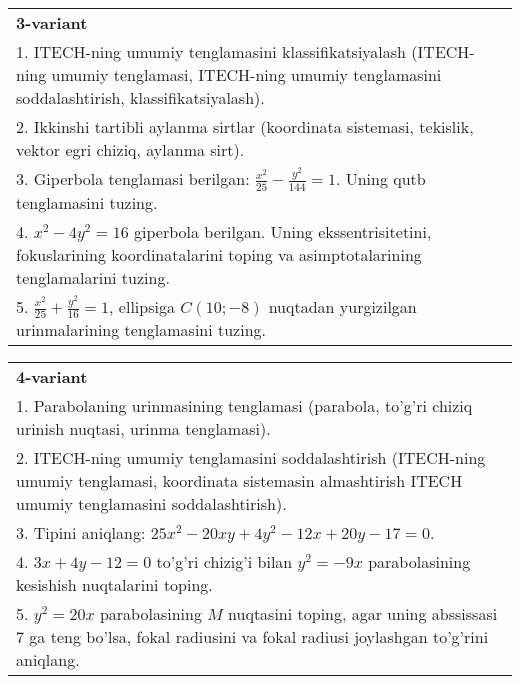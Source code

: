 \documentclass{article}
\begin{document}
\begin{tabular}{m{17cm}}
\textbf{3-variant}\\
1. ITECH-ning umumiy tenglamasini klassifikatsiyalash (ITECH-ning umumiy tenglamasi, ITECH-ning umumiy tenglamasini soddalashtirish, klassifikatsiyalash).\\

2. Ikkinshi tartibli aylanma sirtlar (koordinata sistemasi, tekislik, vektor egri chiziq, aylanma sirt).\\

3. Giperbola tenglamasi berilgan: $\frac{x^{2}}{25}-\frac{y^{2}}{144}=1$. Uning qutb tenglamasini tuzing.\\

4. $x^{2} - 4y^{2} = 16$ giperbola berilgan. Uning ekssentrisitetini, fokuslarining koordinatalarini toping va asimptotalarining tenglamalarini tuzing.\\

5. $\frac{x^{2}}{25} + \frac{y^{2}}{16} = 1$, ellipsiga $C(10; - 8)$ nuqtadan yurgizilgan urinmalarining tenglamasini tuzing.  
\end{tabular}
\vspace{1cm}


\begin{tabular}{m{17cm}}
\textbf{4-variant}\\
1. Parabolaning urinmasining tenglamasi (parabola, to'g'ri chiziq urinish nuqtasi, urinma tenglamasi).\\

2. ITECH-ning umumiy tenglamasini soddalashtirish (ITECH-ning umumiy tenglamasi, koordinata sistemasin almashtirish ITECH umumiy tenglamasini soddalashtirish).\\

3. Tipini aniqlang: $25x^{2}-20xy+4y^{2}-12x+20y-17=0$.\\

4. $3x + 4y - 12 = 0$ to'g'ri chizig'i bilan $y^{2} = - 9x$ parabolasining kesishish nuqtalarini toping.  \\

5. $y^{2} = 20x$ parabolasining $M$ nuqtasini toping, agar uning abssissasi 7 ga teng bo'lsa, fokal radiusini va fokal radiusi joylashgan to'g'rini aniqlang.
\end{tabular}
\vspace{1cm}
\end{document}
